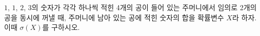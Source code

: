$1$, $1$, $2$, $3$의 숫자가 각각 하나씩 적힌 4개의 공이 들어 있는 주머니에서 임의로 2개의 공을 동시에 꺼낼 때, 주머니에 남아 있는 공에 적힌 숫자의 합을 확률변수 $X$라 하자. 이때 $\sigma(X)$를 구하시오.
